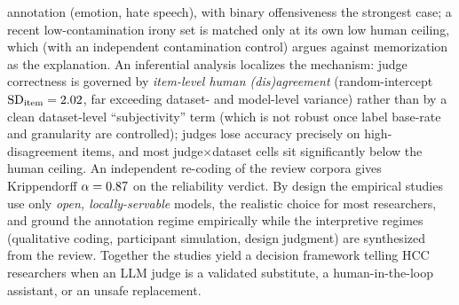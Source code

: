annotation (emotion, hate speech), with binary offensiveness the strongest case; a recent low-contamination irony
set is matched only at its own low human ceiling, which (with an independent contamination control) argues against
memorization as the explanation. An inferential analysis localizes the mechanism: judge correctness is governed by
\emph{item-level human (dis)agreement} (random-intercept $\mathrm{SD}_{\text{item}}=2.02$, far exceeding
dataset- and model-level variance) rather than by a clean dataset-level ``subjectivity'' term (which is not robust
once label base-rate and granularity are controlled); judges lose accuracy precisely on high-disagreement items, and
most judge$\times$dataset cells sit significantly below the human ceiling. An independent re-coding of the review
corpora gives Krippendorff $\alpha=0.87$ on the reliability verdict. By design the empirical studies use only
\emph{open, locally-servable} models, the realistic choice for most researchers, and ground the annotation regime
empirically while the interpretive regimes (qualitative coding, participant simulation, design judgment) are
synthesized from the review. Together the studies yield a
decision framework telling HCC researchers when an LLM judge is a validated substitute, a human-in-the-loop
assistant, or an unsafe replacement.
